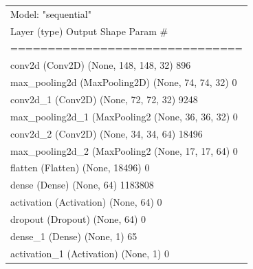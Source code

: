 \documentclass{svproc}
\begin{document}
\begin{table}[]
\centering
\begin{tabular}{l}
Model: "sequential"                                                                                                                \\

Layer (type)                 Output Shape              Param \#                                                                    \\
===============================                                                   \\
conv2d (Conv2D)              (None, 148, 148, 32)      896                                                                         \\
max\_pooling2d (MaxPooling2D) (None, 74, 74, 32)        0                                                                          \\
conv2d\_1 (Conv2D)            (None, 72, 72, 32)        9248                                                                       \\
max\_pooling2d\_1 (MaxPooling2 (None, 36, 36, 32)        0                                                                         \\
conv2d\_2 (Conv2D)            (None, 34, 34, 64)        18496                                                                      \\
max\_pooling2d\_2 (MaxPooling2 (None, 17, 17, 64)        0                                                                         \\
flatten (Flatten)            (None, 18496)             0                                                                           \\
dense (Dense)                (None, 64)                1183808                                                                     \\
activation (Activation)      (None, 64)                0                                                                           \\
dropout (Dropout)            (None, 64)                0                                                                           \\
dense\_1 (Dense)              (None, 1)                 65                                                                         \\
activation\_1 (Activation)    (None, 1)                 0                                                                          \\

\end{tabular}
\end{table}
\end{document}
